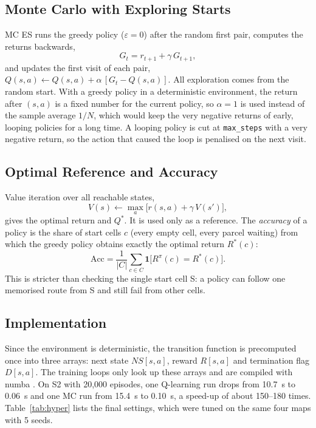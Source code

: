 \documentclass[conference]{IEEEtran}
\newcommand{\Qs}{Q^{*}}
\newcommand{\eps}{\varepsilon}
\begin{document}
\subsection{Monte Carlo with Exploring Starts}
MC ES \cite{b1} runs the greedy policy ($\eps=0$) after the random first pair, computes the returns backwards,
\begin{equation}
G_t=r_{t+1}+\gamma\,G_{t+1},
\end{equation}
and updates the first visit of each pair, $Q(s,a)\leftarrow Q(s,a)+\alpha\,[G_t-Q(s,a)]$. All exploration comes from the random start. With a greedy policy in a deterministic environment, the return after $(s,a)$ is a fixed number for the current policy, so $\alpha=1$ is used instead of the sample average $1/N$, which would keep the very negative returns of early, looping policies for a long time. A looping policy is cut at \texttt{max\_steps} with a very negative return, so the action that caused the loop is penalised on the next visit.

\subsection{Optimal Reference and Accuracy}
Value iteration \cite{b8} over all reachable states,
\begin{equation}
V(s)\leftarrow\max_a\big[r(s,a)+\gamma\,V(s')\big],
\end{equation}
gives the optimal return and $\Qs$. It is used only as a reference. The \emph{accuracy} of a policy is the share of start cells $c$ (every empty cell, every parcel waiting) from which the greedy policy obtains exactly the optimal return $R^{*}(c)$:
\begin{equation}
\mathrm{Acc}=\frac{1}{|C|}\sum_{c\in C}\mathbf{1}\big[R^{\pi}(c)=R^{*}(c)\big].
\end{equation}
This is stricter than checking the single start cell S: a policy can follow one memorised route from S and still fail from other cells.

\subsection{Implementation}
Since the environment is deterministic, the transition function is precomputed once into three arrays: next state $NS[s,a]$, reward $R[s,a]$ and termination flag $D[s,a]$. The training loops only look up these arrays and are compiled with numba \cite{b6}. On S2 with 20,000 episodes, one Q-learning run drops from 10.7~s to 0.06~s and one MC run from 15.4~s to 0.10~s, a speed-up of about 150--180 times. Table~\ref{tab:hyper} lists the final settings, which were tuned on the same four maps with 5 seeds.
\end{document}
